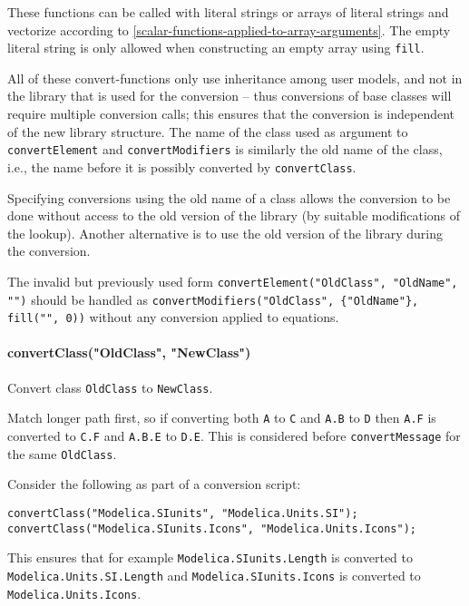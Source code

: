 These functions can be called with literal strings or arrays of literal strings and vectorize according to \cref{scalar-functions-applied-to-array-arguments}.
The empty literal string is only allowed when constructing an empty array using \lstinline!fill!.

All of these convert-functions only use inheritance among user models, and not in the library that is used for the conversion -- thus conversions of base classes will require multiple conversion calls; this ensures that the conversion is independent of the new library structure.
The name of the class used as argument to \lstinline!convertElement! and \lstinline!convertModifiers! is similarly the old name of the class, i.e., the name before it is possibly converted by \lstinline!convertClass!.

\begin{nonnormative}
Specifying conversions using the old name of a class allows the conversion to be done without access to the old version of the library (by suitable modifications of the lookup).
Another alternative is to use the old version of the library during the conversion.

The invalid but previously used form \lstinline!convertElement("OldClass", "OldName", "")! should be handled as \lstinline!convertModifiers("OldClass", {"OldName"}, fill("", 0))! without any conversion applied to equations.
\end{nonnormative}

\paragraph*{convertClass("OldClass", "NewClass")}\label{convertclassoldclassnewclass}

Convert class \lstinline!OldClass! to \lstinline!NewClass!.

Match longer path first, so if converting both \lstinline!A! to \lstinline!C! and \lstinline!A.B! to \lstinline!D! then \lstinline!A.F! is converted to \lstinline!C.F! and \lstinline!A.B.E! to \lstinline!D.E!.
This is considered before \lstinline!convertMessage! for the same \lstinline!OldClass!.

\begin{example}
Consider the following as part of a conversion script:
\begin{lstlisting}[language=modelica]
convertClass("Modelica.SIunits", "Modelica.Units.SI");
convertClass("Modelica.SIunits.Icons", "Modelica.Units.Icons");
\end{lstlisting}
This ensures that for example \lstinline!Modelica.SIunits.Length! is converted to \lstinline!Modelica.Units.SI.Length!
and \lstinline!Modelica.SIunits.Icons! is converted to \lstinline!Modelica.Units.Icons!.
\end{example}

